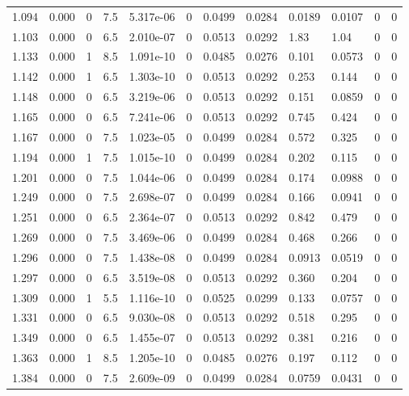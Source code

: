 \documentclass[preview]{standalone}
\begin{document}
{{{\begin{tabular}{L{1.2cm}C{1.2cm} C{0.3cm}C{0.5cm} C{1.4cm}C{1.4cm} C{1.4cm}C{1.4cm} C{1.6cm}C{1.6cm} C{1.6cm}C{1.6cm}}
  1.094  &  0.000  & 0     & 7.5 &  5.317e-06  & 0  &  0.0499&   0.0284& 0.0189 & 0.0107   &  0 & 0  \\ 
  1.103  &  0.000  & 0     & 6.5 &  2.010e-07  & 0  &  0.0513&   0.0292& 1.83 & 1.04   &  0 & 0  \\ 
  1.133  &  0.000  & 1     & 8.5 &  1.091e-10  & 0  &  0.0485&   0.0276& 0.101 & 0.0573   &  0 & 0  \\ 
  1.142  &  0.000  & 1     & 6.5 &  1.303e-10  & 0  &  0.0513&   0.0292& 0.253 & 0.144   &  0 & 0  \\ 
  1.148  &  0.000  & 0     & 6.5 &  3.219e-06  & 0  &  0.0513&   0.0292& 0.151 & 0.0859   &  0 & 0  \\ 
  1.165  &  0.000  & 0     & 6.5 &  7.241e-06  & 0  &  0.0513&   0.0292& 0.745 & 0.424   &  0 & 0  \\ 
  1.167  &  0.000  & 0     & 7.5 &  1.023e-05  & 0  &  0.0499&   0.0284& 0.572 & 0.325   &  0 & 0  \\ 
  1.194  &  0.000  & 1     & 7.5 &  1.015e-10  & 0  &  0.0499&   0.0284& 0.202 & 0.115   &  0 & 0  \\ 
  1.201  &  0.000  & 0     & 7.5 &  1.044e-06  & 0  &  0.0499&   0.0284& 0.174 & 0.0988   &  0 & 0  \\ 
  1.249  &  0.000  & 0     & 7.5 &  2.698e-07  & 0  &  0.0499&   0.0284& 0.166 & 0.0941   &  0 & 0  \\ 
  1.251  &  0.000  & 0     & 6.5 &  2.364e-07  & 0  &  0.0513&   0.0292& 0.842 & 0.479   &  0 & 0  \\ 
  1.269  &  0.000  & 0     & 7.5 &  3.469e-06  & 0  &  0.0499&   0.0284& 0.468 & 0.266   &  0 & 0  \\ 
  1.296  &  0.000  & 0     & 7.5 &  1.438e-08  & 0  &  0.0499&   0.0284& 0.0913 & 0.0519   &  0 & 0  \\ 
  1.297  &  0.000  & 0     & 6.5 &  3.519e-08  & 0  &  0.0513&   0.0292& 0.360 & 0.204   &  0 & 0  \\ 
  1.309  &  0.000  & 1     & 5.5 &  1.116e-10  & 0  &  0.0525&   0.0299& 0.133 & 0.0757   &  0 & 0  \\ 
  1.331  &  0.000  & 0     & 6.5 &  9.030e-08  & 0  &  0.0513&   0.0292& 0.518 & 0.295   &  0 & 0  \\ 
  1.349  &  0.000  & 0     & 6.5 &  1.455e-07  & 0  &  0.0513&   0.0292& 0.381 & 0.216   &  0 & 0  \\ 
  1.363  &  0.000  & 1     & 8.5 &  1.205e-10  & 0  &  0.0485&   0.0276& 0.197 & 0.112   &  0 & 0  \\ 
  1.384  &  0.000  & 0     & 7.5 &  2.609e-09  & 0  &  0.0499&   0.0284& 0.0759 & 0.0431   &  0 & 0  \\ 

\end{tabular}}}}
\end{document}
